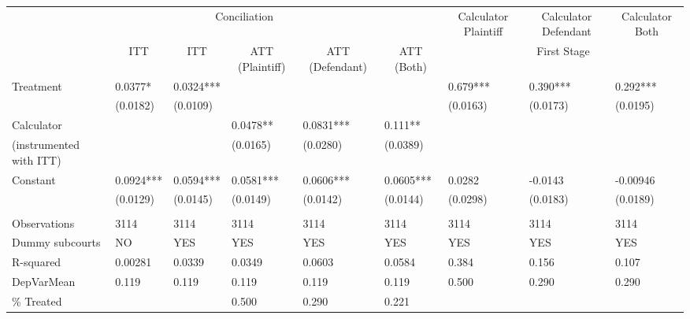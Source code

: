 \begin{tabular}{lrrlllrrr}
      & \multicolumn{4}{c}{Conciliation} &       & \multicolumn{1}{c}{Calculator Plaintiff} & \multicolumn{1}{c}{Calculator Defendant} & \multicolumn{1}{c}{Calculator Both} \\
\cmidrule{2-9}      & \multicolumn{1}{c}{ITT} & \multicolumn{1}{c}{ITT} & \multicolumn{1}{c}{ATT (Plaintiff)} & \multicolumn{1}{c}{ATT  (Defendant)} & \multicolumn{1}{c}{ATT (Both)} & \multicolumn{3}{c}{First Stage} \\
\cmidrule{2-9}Treatment  & \multicolumn{1}{l}{0.0377*} & \multicolumn{1}{l}{0.0324***} &       &       &       & \multicolumn{1}{l}{0.679***} & \multicolumn{1}{l}{0.390***} & \multicolumn{1}{l}{0.292***} \\
      & \multicolumn{1}{l}{(0.0182)} & \multicolumn{1}{l}{(0.0109)} &       &       &       & \multicolumn{1}{l}{(0.0163)} & \multicolumn{1}{l}{(0.0173)} & \multicolumn{1}{l}{(0.0195)} \\
Calculator  & \multicolumn{1}{l}{} & \multicolumn{1}{l}{} & 0.0478** & 0.0831*** & 0.111** &       &       &  \\
(instrumented with ITT) & \multicolumn{1}{l}{} & \multicolumn{1}{l}{} & (0.0165) & (0.0280) & (0.0389) &       &       &  \\
Constant  & \multicolumn{1}{l}{0.0924***} & \multicolumn{1}{l}{0.0594***} & 0.0581*** & 0.0606*** & 0.0605*** & \multicolumn{1}{l}{0.0282} & \multicolumn{1}{l}{-0.0143} & \multicolumn{1}{l}{-0.00946} \\
      & \multicolumn{1}{l}{(0.0129)} & \multicolumn{1}{l}{(0.0145)} & (0.0149) & (0.0142) & (0.0144) & \multicolumn{1}{l}{(0.0298)} & \multicolumn{1}{l}{(0.0183)} & \multicolumn{1}{l}{(0.0189)} \\
      &       &       &       &       &       &       &       &  \\
\midrule
Observations & \multicolumn{1}{l}{3114} & \multicolumn{1}{l}{3114} & 3114  & 3114  & 3114  & \multicolumn{1}{l}{3114} & \multicolumn{1}{l}{3114} & \multicolumn{1}{l}{3114} \\
Dummy subcourts & \multicolumn{1}{l}{NO} & \multicolumn{1}{l}{YES} & YES   & YES   & YES   & \multicolumn{1}{l}{YES} & \multicolumn{1}{l}{YES} & \multicolumn{1}{l}{YES} \\
R-squared & \multicolumn{1}{l}{0.00281} & \multicolumn{1}{l}{0.0339} & 0.0349 & 0.0603 & 0.0584 & \multicolumn{1}{l}{0.384} & \multicolumn{1}{l}{0.156} & \multicolumn{1}{l}{0.107} \\
DepVarMean & \multicolumn{1}{l}{0.119} & \multicolumn{1}{l}{0.119} & 0.119 & 0.119 & 0.119 & \multicolumn{1}{l}{0.500} & \multicolumn{1}{l}{0.290} & \multicolumn{1}{l}{0.290} \\
\% Treated &       &       & 0.500 & 0.290 & 0.221 &       &       &  \\
\bottomrule
\bottomrule
\end{tabular}%
